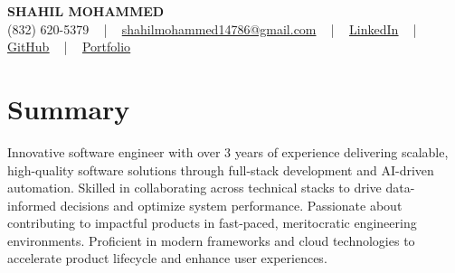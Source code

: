 \documentclass[letterpaper,10pt]{article}
\begin{document}
\begin{center}
    {\fontsize{14pt}{12pt}\selectfont \textbf{\MakeUppercase{Shahil Mohammed}}}\\ \vspace{2pt}
    \fontsize{10pt}{12pt}\selectfont (832) 620-5379 ~ | ~ \href{mailto:shahilmohammed14786@gmail.com}{shahilmohammed14786@gmail.com} ~ | ~  
    \href{https://www.linkedin.com/in/shahil-mohammed-9652931a1/}{\color{blue}\underline{LinkedIn}}  ~ | ~ 
    \href{https://github.com/freakbeast14}{\color{blue}\underline{GitHub}} ~ | ~ 
    \href{https://shahil-mohammed.netlify.app/}{\color{blue}\underline{Portfolio}}
    \vspace{-8pt}
\end{center}

\section{Summary}
\vspace{-2pt}\fontsize{8pt}{9pt}\selectfont
Innovative software engineer with over 3 years of experience delivering scalable, high-quality software solutions through full-stack development and AI-driven automation. Skilled in collaborating across technical stacks to drive data-informed decisions and optimize system performance. Passionate about contributing to impactful products in fast-paced, meritocratic engineering environments. Proficient in modern frameworks and cloud technologies to accelerate product lifecycle and enhance user experiences.
 \vspace{-5pt}
 
\vspace{-2pt}
\end{document}
